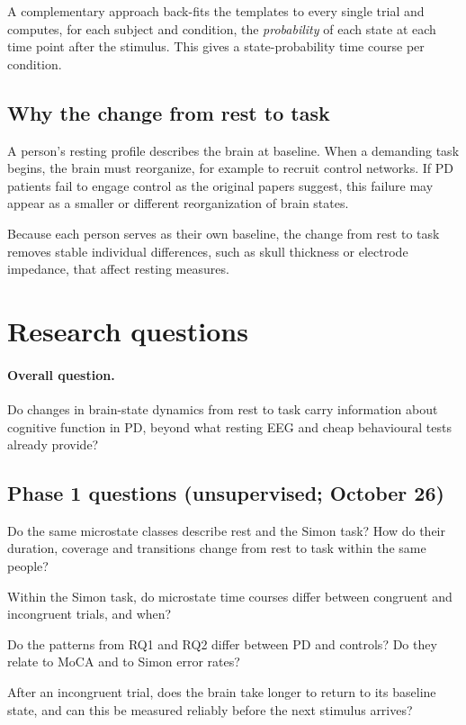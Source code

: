 \documentclass[11pt,a4paper]{article}
\begin{document}
A complementary approach back-fits the templates to every single trial and computes, for each subject and condition, the \emph{probability} of each state at each time point after the stimulus. This gives a state-probability time course per condition.

\subsection{Why the change from rest to task}

A person's resting profile describes the brain at baseline. When a demanding task begins, the brain must reorganize, for example to recruit control networks. If PD patients fail to engage control as the original papers suggest, this failure may appear as a smaller or different reorganization of brain states.

Because each person serves as their own baseline, the change from rest to task removes stable individual differences, such as skull thickness or electrode impedance, that affect resting measures.

\section{Research questions}

\paragraph{Overall question.} Do changes in brain-state dynamics from rest to task carry information about cognitive function in PD, beyond what resting EEG and cheap behavioural tests already provide?

\subsection*{Phase 1 questions (unsupervised; October 26)}

\begin{description}[leftmargin=1.2em, style=nextline]
  \item[RQ1 --- Rest vs task.] Do the same microstate classes describe rest and the Simon task? How do their duration, coverage and transitions change from rest to task within the same people?
  \item[RQ2 --- Conflict.] Within the Simon task, do microstate time courses differ between congruent and incongruent trials, and when?
  \item[RQ3 --- Groups and cognition (preliminary).] Do the patterns from RQ1 and RQ2 differ between PD and controls? Do they relate to MoCA and to Simon error rates?
  \item[Exploratory --- Recovery after conflict.] After an incongruent trial, does the brain take longer to return to its baseline state, and can this be measured reliably before the next stimulus arrives?
\end{description}
\end{document}
